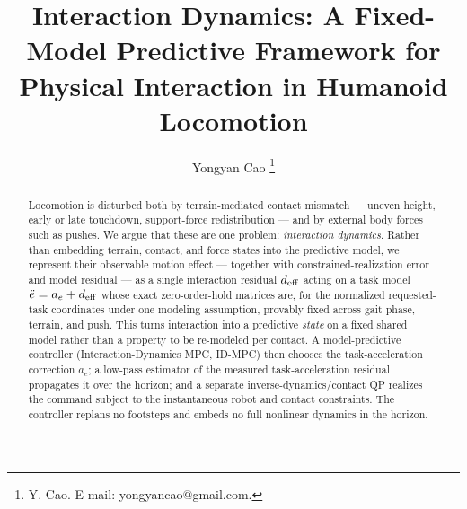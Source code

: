 \documentclass[journal]{IEEEtran}
\theoremstyle{plain}
\theoremstyle{definition}
\theoremstyle{remark}
\newcommand{\deff}{d_{\rm eff}}
\begin{document}
\title{Interaction Dynamics: A Fixed-Model Predictive Framework for Physical Interaction in Humanoid Locomotion}
\author{Yongyan Cao%
\thanks{Y. Cao. E-mail: yongyancao@gmail.com.}}
\maketitle

\begin{abstract}
Locomotion is disturbed both by terrain-mediated contact mismatch --- uneven height, early or late touchdown, support-force redistribution --- and by external body forces such as pushes. We argue that these are one problem: \emph{interaction dynamics}. Rather than embedding terrain, contact, and force states into the predictive model, we represent their observable motion effect --- together with constrained-realization error and model residual --- as a single interaction residual $\deff$ acting on a task model $\ddot e=a_e+\deff$ whose exact zero-order-hold matrices are, for the normalized requested-task coordinates under one modeling assumption, provably fixed across gait phase, terrain, and push. This turns interaction into a predictive \emph{state} on a fixed shared model rather than a property to be re-modeled per contact. A model-predictive controller (Interaction-Dynamics MPC, ID-MPC) then chooses the task-acceleration correction $a_e$; a low-pass estimator of the measured task-acceleration residual propagates it over the horizon; and a separate inverse-dynamics/contact QP realizes the command subject to the instantaneous robot and contact constraints. The controller replans no footsteps and embeds no full nonlinear dynamics in the horizon.


\end{abstract}
\end{document}
